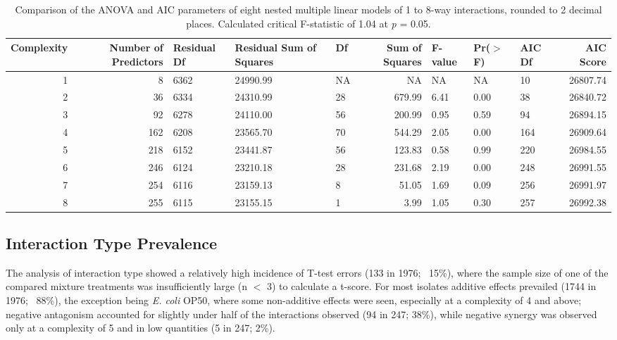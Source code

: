 \documentclass[10pt]{article}
\begin{document}
\begin{table}[H]
\centering
\tiny
\begin{tabular}{N N O P O N O O O N}
\toprule 
\textbf{Complexity} & \textbf{Number of Predictors} & \textbf{Residual Df} & \textbf{Residual Sum of Squares} & \textbf{Df} & \textbf{Sum of Squares} & \textbf{F-value} & \textbf{Pr($>$F)} & \textbf{AIC Df} & \textbf{AIC Score} \\
\midrule
{}   1 & 8   & 6362 & 24990.99 & NA  & NA        & NA   & NA   & 10  & 26807.74 \\
                    2 & 36  & 6334 & 24310.99 & 28  & 679.99    & 6.41 & 0.00 & 38  & 26840.72 \\
   3 & 92  & 6278 & 24110.00 & 56  & 200.99    & 0.95 & 0.59 & 94  & 26894.15 \\
                    4 & 162 & 6208 & 23565.70 & 70  & 544.29    & 2.05 & 0.00 & 164 & 26909.64 \\
   5 & 218 & 6152 & 23441.87 & 56  & 123.83    & 0.58 & 0.99 & 220 & 26984.55 \\
                    6 & 246 & 6124 & 23210.18 & 28  & 231.68    & 2.19 & 0.00 & 248 & 26991.55 \\
   7 & 254 & 6116 & 23159.13 & 8   & 51.05     & 1.69 & 0.09 & 256 & 26991.97 \\
                    8 & 255 & 6115 & 23155.15 & 1   & 3.99      & 1.05 & 0.30 & 257 & 26992.38 \\     
\bottomrule
\end{tabular}
\caption{Comparison of the ANOVA and AIC parameters of eight nested multiple linear models of 1 to 8-way interactions, rounded to 2 decimal places. Calculated critical F-statistic of 1.04 at \textit{p} = 0.05.}
\label{tab:lmodels}
\end{table}

\newpage
\subsection{Interaction Type Prevalence}
\label{S:3:7}

The analysis of interaction type showed a relatively high incidence of T-test errors (133 in 1976; ~15\%), where the sample size of one of the compared mixture treatments was insufficiently large (n $<$ 3) to calculate a t-score. For most isolates additive effects prevailed (1744 in 1976; ~88\%), the exception being \textit{E. coli} OP50, where some non-additive effects were seen, especially at a complexity of 4 and above; negative antagonism accounted for slightly under half of the interactions observed (94 in 247; 38\%), while negative synergy was observed only at a complexity of 5 and in low quantities (5 in 247; 2\%).
\end{document}
